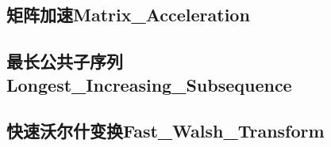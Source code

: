 \documentclass[10pt,a4paper]{article}
\begin{document}
\subsection{矩阵加速Matrix\_Acceleration}

\subsection{最长公共子序列Longest\_Increasing\_Subsequence}

\subsection{快速沃尔什变换Fast\_Walsh\_Transform}

\end{document}
